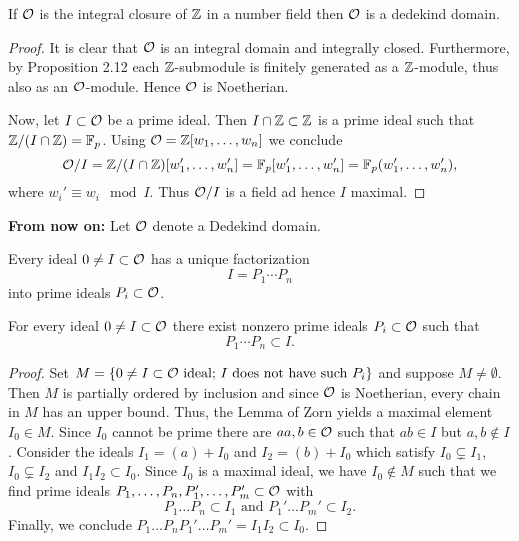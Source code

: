 \begin{Prop}
	If $\mathcal{O}$ is the integral closure of $\mathbb{Z}$ in a number field then $\mathcal{O}$ is a dedekind domain.
\end{Prop}


\begin{proof}
	It is clear that $\mathcal{O}$ is an integral domain and integrally closed.
	Furthermore, by Proposition 2.12 each $\mathbb{Z}$-submodule is finitely generated as a $\mathbb{Z}$-module, thus also as an $\mathcal{O}$-module. Hence $\mathcal{O}$ is Noetherian.
	
	Now, let $I \subset \mathcal{O}$ be a prime ideal. Then $I \cap \mathbb{Z} \subset \mathbb{Z}$ is a prime ideal such that $\mathbb{Z}/(I\cap \mathbb{Z}) =\mathbb{F}_p$.
	Using $\mathcal{O}= \mathbb{Z}[w_1,\dots, w_n]$ we conclude
	\[ \mathcal{O}/ I = \mathbb{Z}/(I\cap \mathbb{Z}) [w_1', \dots, w_n'] 
	= \mathbb{F}_p [w_1', \dots, w_n'] 
	= \mathbb{F}_p (w_1', \dots, w_n'),
	\]
	where $w_i' \equiv w_i \mod I$. Thus $\mathcal{O}/ I$ is a field ad hence $I$ maximal.
\end{proof}

\textbf{From now on:} Let $\mathcal{O}$ denote a Dedekind domain.

\begin{Satz}
	Every ideal $0 \neq I \subset \mathcal{O}$ has a unique factorization
	\[ I = P_1 \cdots P_n
	\]
	into prime ideals $P_i \subset \mathcal{O}$.
\end{Satz}

\begin{Lem}
	For every ideal $0\neq I \subset \mathcal{O}$ there exist nonzero prime ideals $P_i \subset \mathcal{O}$ such that
	\[ P_1 \cdots P_n \subset I.
	\]
\end{Lem}

\begin{proof}Set $M = \{ 0 \neq I \subset \mathcal{O} \text{ ideal; } I \text{ does not have such } P_i \}$ and suppose $M \neq \emptyset$. Then $M$ is partially ordered by inclusion and since $\mathcal{O}$ is Noetherian, every chain in $M$ has an upper bound.
	Thus, the Lemma of Zorn yields a maximal element $I_0 \in M$. Since $I_0$ cannot be prime there are $aa,b \in \mathcal{O}$ such that $ab \in I$ but $a,b \not \in I$.
	Consider the ideals $I_1 = (a) +I_0$ and $I_2 =(b) + I_0$ which satisfy $I_0 \subsetneq I_1$, $I_0 \subsetneq I_2$ and $I_1I_2 \subset I_0$.
	Since $I_0$ is a maximal ideal, we have $I_0 \not \in M$ such that we find 
	prime ideals $P_1, \dots, P_n, P_1', \dots, P_m' \subset \mathcal{O}$ with
	\[ P_1 \dots P_n \subset I_1 \text{ and } P_1' \dots P_m' \subset I_2.
	\]
	Finally, we conclude $  P_1 \dots P_nP_1' \dots P_m' = I_1I_2 \subset I_0$.
\end{proof}

